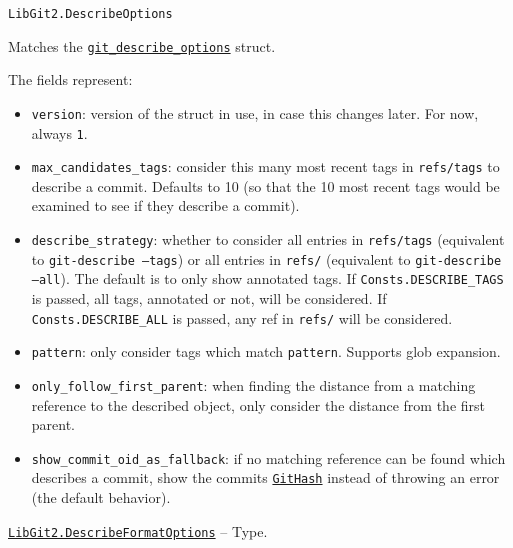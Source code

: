 \begin{adjustwidth}{2em}{0pt}


\begin{verbatim}
LibGit2.DescribeOptions
\end{verbatim}

Matches the \href{https://libgit2.org/libgit2/\#HEAD/type/git\_describe\_options}{\texttt{git\_describe\_options}} struct.

The fields represent:

\begin{itemize}
\item \texttt{version}: version of the struct in use, in case this changes later. For now, always \texttt{1}.


\item \texttt{max\_candidates\_tags}: consider this many most recent tags in \texttt{refs/tags} to describe a commit.  Defaults to 10 (so that the 10 most recent tags would be examined to see if they describe a commit).


\item \texttt{describe\_strategy}: whether to consider all entries in \texttt{refs/tags} (equivalent to \texttt{git-describe --tags})  or all entries in \texttt{refs/} (equivalent to \texttt{git-describe --all}). The default is to only show annotated tags.  If \texttt{Consts.DESCRIBE\_TAGS} is passed, all tags, annotated or not, will be considered.  If \texttt{Consts.DESCRIBE\_ALL} is passed, any ref in \texttt{refs/} will be considered.


\item \texttt{pattern}: only consider tags which match \texttt{pattern}. Supports glob expansion.


\item \texttt{only\_follow\_first\_parent}: when finding the distance from a matching reference to the described  object, only consider the distance from the first parent.


\item \texttt{show\_commit\_oid\_as\_fallback}: if no matching reference can be found which describes a commit, show the  commit{\textquotesingle}s \hyperlink{202290709580230708}{\texttt{GitHash}} instead of throwing an error (the default behavior).

\end{itemize}


\end{adjustwidth}
\hypertarget{6319202671460827960}{}
\hyperlink{6319202671460827960}{\texttt{LibGit2.DescribeFormatOptions}}  -- {Type.}

